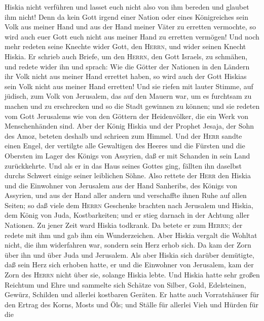 Hiskia nicht verführen und lasset euch nicht also von ihm bereden und
glaubet ihm nicht! Denn da kein Gott irgend einer Nation oder eines
Königreiches sein Volk aus meiner Hand und aus der Hand meiner Väter zu
erretten vermochte, so wird auch euer Gott euch nicht aus meiner Hand zu
erretten vermögen!  Und noch mehr redeten seine Knechte
wider Gott, den \textsc{Herrn}, und wider seinen Knecht Hiskia.
 Er schrieb auch Briefe, um den \textsc{Herrn}, den Gott
Israels, zu schmähen, und redete wider ihn und sprach: Wie die Götter
der Nationen in den Ländern ihr Volk nicht aus meiner Hand errettet
haben, so wird auch der Gott Hiskias sein Volk nicht aus meiner Hand
erretten!  Und sie riefen mit lauter Stimme, auf jüdisch,
zum Volk von Jerusalem, das auf den Mauern war, um es furchtsam zu
machen und zu erschrecken und so die Stadt gewinnen zu können;
 und sie redeten vom Gott Jerusalems wie von den Göttern
der Heidenvölker, die ein Werk von Menschenhänden sind. 
Aber der König Hiskia und der Prophet Jesaja, der Sohn des Amoz, beteten
deshalb und schrieen zum Himmel.  Und der \textsc{Herr}
sandte einen Engel, der vertilgte alle Gewaltigen des Heeres und die
Fürsten und die Obersten im Lager des Königs von Assyrien, daß er mit
Schanden in sein Land zurückkehrte. Und als er in das Haus seines Gottes
ging, fällten ihn daselbst durchs Schwert einige seiner leiblichen
Söhne.  Also rettete der \textsc{Herr} den Hiskia und die
Einwohner von Jerusalem aus der Hand Sanheribs, des Königs von Assyrien,
und aus der Hand aller andern und verschaffte ihnen Ruhe auf allen
Seiten;  so daß viele dem \textsc{Herrn} Geschenke
brachten nach Jerusalem und Hiskia, dem König von Juda, Kostbarkeiten;
und er stieg darnach in der Achtung aller Nationen.  Zu
jener Zeit ward Hiskia todkrank. Da betete er zum \textsc{Herrn}; der
redete mit ihm und gab ihm ein Wunderzeichen.  Aber
Hiskia vergalt die Wohltat nicht, die ihm widerfahren war, sondern sein
Herz erhob sich. Da kam der Zorn über ihn und über Juda und Jerusalem.
 Als aber Hiskia sich darüber demütigte, daß sein Herz
sich erhoben hatte, er und die Einwohner von Jerusalem, kam der Zorn des
\textsc{Herrn} nicht über sie, solange Hiskia lebte.  Und
Hiskia hatte sehr großen Reichtum und Ehre und sammelte sich Schätze von
Silber, Gold, Edelsteinen, Gewürz, Schilden und allerlei kostbaren
Geräten.  Er hatte auch Vorratshäuser für den Ertrag des
Korns, Mosts und Öls; und Ställe für allerlei Vieh und Hürden für die
